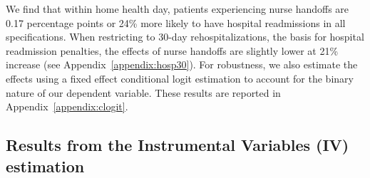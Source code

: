 \documentclass[final,12pt, notitlepage]{article}
\begin{document}
We find that within home health day, patients experiencing nurse handoffs are 0.17 percentage points or 24\% more likely to have hospital readmissions in all specifications.
When restricting to 30-day rehospitalizations, the basis for hospital readmission penalties, the effects of nurse handoffs are slightly lower at 21\% increase (see Appendix~\ref{appendix:hosp30}). For robustness, we also estimate the effects using a fixed effect conditional logit estimation to account for the binary nature of our dependent variable. These results are reported in Appendix~\ref{appendix:clogit}.


\subsection{Results from the Instrumental Variables (IV) estimation} \label{sec:iv}
\end{document}
